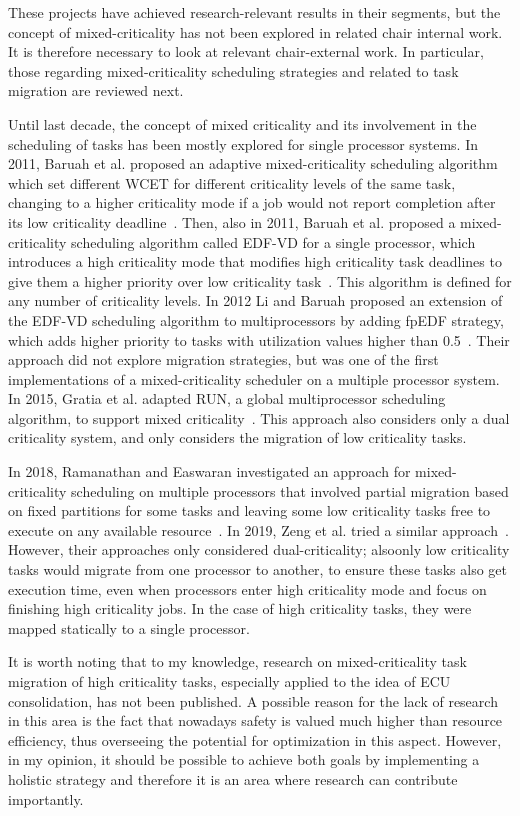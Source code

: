 These projects have achieved research-relevant results in their segments, but the concept of mixed-criticality has not been explored in related chair internal work. It is therefore necessary to look at relevant chair-external work. In particular, those regarding mixed-criticality scheduling strategies and related to task migration are reviewed next.

Until last decade, the concept of mixed criticality and its involvement in the scheduling of tasks has been mostly explored for single processor systems. In 2011, Baruah et al. proposed an adaptive mixed-criticality scheduling algorithm which set different WCET for different criticality levels of the same task, changing to a higher criticality mode if a job would not report completion after its low criticality deadline~\parencite{baruah2}. Then, also in 2011, Baruah et al. proposed a mixed-criticality scheduling algorithm called EDF-VD for a single processor, which introduces a high criticality mode that modifies high criticality task deadlines to give them a higher priority over low criticality task~\parencite{baruah1}. This algorithm is defined for any number of criticality levels. In 2012 Li and Baruah proposed an extension of the EDF-VD scheduling algorithm to multiprocessors by adding fpEDF strategy, which adds higher priority to tasks with utilization values higher than 0.5~\parencite{libaruah1}. Their approach did not explore migration strategies, but was one of the first implementations of a mixed-criticality scheduler on a multiple processor system. In 2015, Gratia et al. adapted RUN, a global multiprocessor scheduling algorithm, to support mixed criticality~\parencite{gratia1}. This approach also considers only a dual criticality system, and only considers the migration of low criticality tasks.

In 2018, Ramanathan and Easwaran investigated an approach for mixed-criticality scheduling on multiple processors that involved partial migration based on fixed partitions for some tasks and leaving some low criticality tasks free to execute on any available resource~\parencite{ramanathan1}. In 2019, Zeng et al. tried a similar approach~\parencite{zeng1}. However, their approaches only considered dual-criticality; alsoonly low criticality tasks would migrate from one processor to another, to ensure these tasks also get execution time, even when processors enter high criticality mode and focus on finishing high criticality jobs. In the case of high criticality tasks, they were mapped statically to a single processor.

It is worth noting that to my knowledge, research on mixed-criticality task migration of high criticality tasks, especially applied to the idea of ECU consolidation, has not been published. A possible reason for the lack of research in this area is the fact that nowadays safety is valued much higher than resource efficiency, thus overseeing the potential for optimization in this aspect. However, in my opinion, it should be possible to achieve both goals by implementing a holistic strategy and therefore it is an area where research can contribute importantly.

